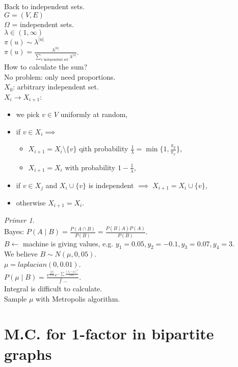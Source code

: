 \documentclass[a4paper, 12pt]{book}
\theoremstyle{definition}
\theoremstyle{remark}
\newtheorem*{ex}{Primer}
\begin{document}

Back to independent sets. \\
$G = (V, E)$ \\
$\Omega$ = independent sets. \\
$\lambda \in (1, \infty)$ \\
$\pi(u) \sim \lambda^{|u|}$ \\
$\pi(u) = \frac{\lambda^{|u|}}{\sum_{v \text{ independent set}} \lambda^{|v|}}$. \\
How to calculate the sum? \\
No problem: only need proportions. \\
$X_0$: arbitrary independent set. \\
$X_i \to X_{i+1}$:
\begin{itemize}
  \item we pick $v \in V$ uniformly at random,
  \item if $v \in X_i \implies$
    \begin{itemize}
      \item $X_{i+1} = X_i \setminus \{v\}$ qith probability $\frac{1}{\lambda} = \min \{1, \frac{\pi_y}{\pi_x}\}$,
      \item $X_{i+1} = X_i$ with probability $1 - \frac{1}{\lambda}$,
    \end{itemize}
  \item if $v \in X_j$ and $X_i \cup \{v\}$ is independent $\implies \; X_{i+1} = X_i \cup \{v\}$,
  \item otherwise $X_{i+1} = X_i$.
\end{itemize}
\begin{ex} \text{} \\
  Bayes: $P(A \mid B) = \frac{P(A \cap B)}{P(B)} = \frac{P(B \mid A) P(A)}{P(B)}$. \\
  $B \leftarrow$ machine is giving values, e.g. $y_1 = 0.05, y_2 = -0.1, y_3 = 0.07, y_4 = 3$. \\
  We believe $B \sim N(\mu, 0,05)$. \\
  $\mu = laplacian(0, 0.01)$. \\
  $P(\mu \mid B) = \frac{e^{\frac{|\mu|}{0.01}} e^{-\sum \frac{(x_i-\mu)^2}{0.05}}}{\int \dots}$. \\
  Integral is difficult to calculate. \\
  Sample $\mu$ with Metropolis algorithm.
\end{ex}


\section{M.C. for 1-factor in bipartite graphs}
\end{document}
